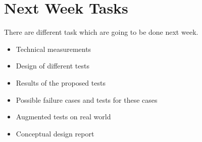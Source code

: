 \section{Next Week Tasks}
\label{sec:nextWeekTasks}
There are different task which are going to be done next week.

\begin{itemize}
    \item Technical measurements
    \item Design of different tests 
    \item Results of the proposed tests
    \item Possible failure cases and tests for these cases
    \item Augmented tests on real world
    \item Conceptual design report
\end{itemize}
